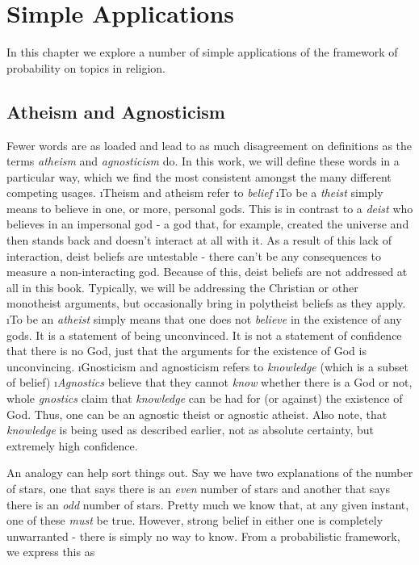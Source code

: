 \chapter{Simple Applications}\label{ch:simpleapp}

In this chapter we explore a number of simple applications of the framework of probability on topics in religion.


\section{Atheism and Agnosticism}\label{sec:atheism_agnosticism}

Fewer words are as loaded and lead to as much disagreement on definitions as the terms {\em atheism} and {\em agnosticism} do.  In this work, we will define these words in a particular way, which we find the most consistent amongst the many different competing usages.  
\bi
\i Theism and atheism refer to {\em belief}
\i To be a {\em theist} simply means to believe in one, or more, personal gods.  This is in contrast to a {\em deist} who believes in an impersonal god - a god that, for example, created the universe and then stands back and doesn't interact at all with it.  As a result of this lack of interaction, deist beliefs are untestable - there can't be any consequences to measure a non-interacting god.  Because of this, deist beliefs are not addressed at all in this book.  Typically, we will be addressing the Christian or other monotheist arguments, but occasionally bring in polytheist beliefs as they apply.
\i To be an {\em atheist} simply means that one does not {\em believe} in the existence of any gods.  It is a statement of being unconvinced.  It is not a statement of confidence that there is no God, just that the arguments for the existence of God is unconvincing.
\i Gnosticism and agnosticism refers to {\em knowledge} (which is a subset of belief)
\i {\em Agnostics} believe that they cannot {\em know} whether there is a God or not, whole {\em gnostics} claim that {\em knowledge} can be had for (or against) the existence of God.  Thus, one can be an agnostic theist or agnostic atheist.  Also note, that {\em knowledge} is being used as described earlier, not as absolute certainty, but extremely high confidence. 
\ei

An analogy can help sort things out.  Say we have two explanations of the number of stars, one that
says there is an \emph{even} number of stars and another that says
 there is an \emph{odd} number of stars. Pretty much we know that,
at any given instant, one of these \emph{must} be true. However, strong
belief in either one is completely unwarranted - there is simply no way
to know. From a probabilistic framework, we express this as

